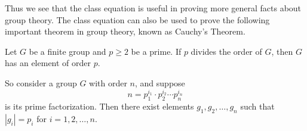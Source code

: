 \documentclass[12pt,letterpaper]{algebra_book}
\theoremstyle{definition}
\begin{document}
    Thus we see that the class equation is useful in proving more
    general facts about group theory. The class equation can also be
    used to prove the following important theorem in group theory,
    known as Cauchy's Theorem. 

    \begin{thm}
        Let $G$ be a finite group and $p \ge 2$ be a prime. If $p$ divides
        the order of $G$, then $G$ has an element of order $p$. 
    \end{thm}

    \noindent\textcolor{NavyBlue}{So consider a group $G$ with order $n$,
    and suppose 
    \[ n = p_1^{i_1}\cdot p_2^{i_2} \cdots
    p_n^{i_n}
    \]
    is its prime factorization. Then there exist elements
    $g_1, g_2, \dots, g_n$ such that $|g_i| = p_i$ for $i = 1, 2,
    \dots, n$.}
\end{document}
